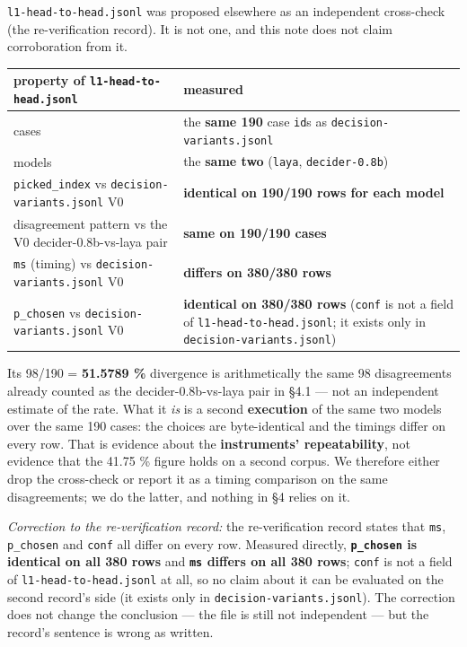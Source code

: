 \documentclass[10pt]{article}
\begin{document}
\texttt{l1-head-to-head.jsonl} was proposed elsewhere as an independent cross-check (the re-verification record). It is not one, and this note does not claim corroboration from it.


\begin{center}
\begin{tabular}{@{}>{\raggedright\arraybackslash}p{}>{\raggedright\arraybackslash}p{}@{}}
\hline
\textbf{property of \texttt{l1-head-to-head.jsonl}} & \textbf{measured} \\ \hline
cases & the \textbf{same 190} case \texttt{id}s as \texttt{decision-variants.jsonl} \\ \hline
models & the \textbf{same two} (\texttt{laya}, \texttt{decider-0.8b}) \\ \hline
\texttt{picked\_index} vs \texttt{decision-variants.jsonl} V0 & \textbf{identical on 190/190 rows for each model} \\ \hline
disagreement pattern vs the V0 decider-0.8b-vs-laya pair & \textbf{same on 190/190 cases} \\ \hline
\texttt{ms} (timing) vs \texttt{decision-variants.jsonl} V0 & \textbf{differs on 380/380 rows} \\ \hline
\texttt{p\_chosen} vs \texttt{decision-variants.jsonl} V0 & \textbf{identical on 380/380 rows} (\texttt{conf} is not a field of \texttt{l1-head-to-head.jsonl}; it exists only in \texttt{decision-variants.jsonl}) \\ \hline
\end{tabular}
\end{center}

Its 98/190 = \textbf{51.5789 \%} divergence is arithmetically the same 98 disagreements already counted as the decider-0.8b-vs-laya pair in \S4.1 --- not an independent estimate of the rate. What it \emph{is} is a second \textbf{execution} of the same two models over the same 190 cases: the choices are byte-identical and the timings differ on every row. That is evidence about the \textbf{instruments' repeatability}, not evidence that the 41.75 \% figure holds on a second corpus. We therefore either drop the cross-check or report it as a timing comparison on the same disagreements; we do the latter, and nothing in \S4 relies on it.

\emph{Correction to the re-verification record:} the re-verification record states that \texttt{ms}, \texttt{p\_chosen} and \texttt{conf} all differ on every row. Measured directly, \textbf{\texttt{p\_chosen} is identical on all 380 rows} and \textbf{\texttt{ms} differs on all 380 rows}; \texttt{conf} is not a field of \texttt{l1-head-to-head.jsonl} at all, so no claim about it can be evaluated on the second record's side (it exists only in \texttt{decision-variants.jsonl}). The correction does not change the conclusion --- the file is still not independent --- but the record's sentence is wrong as written.
\end{document}
